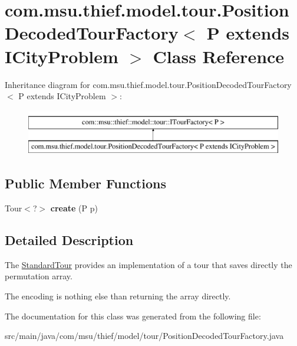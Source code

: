 \hypertarget{classcom_1_1msu_1_1thief_1_1model_1_1tour_1_1PositionDecodedTourFactory_3_01P_01extends_01ICityProblem_01_4}{\section{com.\-msu.\-thief.\-model.\-tour.\-Position\-Decoded\-Tour\-Factory$<$ P extends I\-City\-Problem $>$ Class Reference}
\label{classcom_1_1msu_1_1thief_1_1model_1_1tour_1_1PositionDecodedTourFactory_3_01P_01extends_01ICityProblem_01_4}
}
Inheritance diagram for com.\-msu.\-thief.\-model.\-tour.\-Position\-Decoded\-Tour\-Factory$<$ P extends I\-City\-Problem $>$\-:\begin{figure}[H]
\begin{center}
\leavevmode
\includegraphics[height=2.000000cm]{classcom_1_1msu_1_1thief_1_1model_1_1tour_1_1PositionDecodedTourFactory_3_01P_01extends_01ICityProblem_01_4}
\end{center}
\end{figure}
\subsection*{Public Member Functions}
\begin{DoxyCompactItemize}
\item 
\hypertarget{classcom_1_1msu_1_1thief_1_1model_1_1tour_1_1PositionDecodedTourFactory_3_01P_01extends_01ICityProblem_01_4_aa7d01e1e51cc04d3cfec537264fb61bd}{Tour$<$?$>$ {\bfseries create} (P p)}\label{classcom_1_1msu_1_1thief_1_1model_1_1tour_1_1PositionDecodedTourFactory_3_01P_01extends_01ICityProblem_01_4_aa7d01e1e51cc04d3cfec537264fb61bd}

\end{DoxyCompactItemize}


\subsection{Detailed Description}
The \hyperlink{classcom_1_1msu_1_1thief_1_1model_1_1tour_1_1StandardTour}{Standard\-Tour} provides an implementation of a tour that saves directly the permutation array.

The encoding is nothing else than returning the array directly. 

The documentation for this class was generated from the following file\-:\begin{DoxyCompactItemize}
\item 
src/main/java/com/msu/thief/model/tour/Position\-Decoded\-Tour\-Factory.\-java\end{DoxyCompactItemize}
